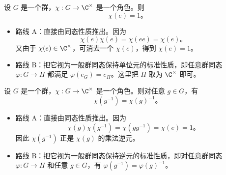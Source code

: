 \begin{theorem}[候选定理 $T_{9}$]
设 $G$ 是一个群，$\chi : G \to \C^\times$ 是一个角色。则
\[
\chi(e)=1。
\]
\end{theorem}

\begin{itemize}
    \item 路线 A：直接由同态性质推出。因为
    \[
    \chi(e)\chi(e)=\chi(ee)=\chi(e)。
    \]
    又由于 $\chi(e)\in \C^\times$，可消去一个 $\chi(e)$，得到
    $
    \chi(e)=1。
    $

    \item 路线 B：把它视为一般群同态保持单位元的标准性质，即任意群同态 $\varphi:G\to H$ 都满足 $\varphi(e_G)=e_H$。这里把 $H$ 取为 $\C^\times$ 即可。
\end{itemize}


\vspace{1em}

\begin{theorem}[候选定理 $T_{10}$]
设 $G$ 是一个群，$\chi : G \to \C^\times$ 是一个角色。则对任意 $g \in G$，有
\[
\chi(g^{-1})=\chi(g)^{-1}。
\]
\end{theorem}

\begin{itemize}
    \item 路线 A：直接由同态性质推出。因为
    \[
    \chi(g)\chi(g^{-1})
    =
    \chi(gg^{-1})
    =
    \chi(e)
    =
    1。
    \]
    因此 $\chi(g^{-1})$ 正是 $\chi(g)$ 的乘法逆元。

    \item 路线 B：把它视为一般群同态保持逆元的标准性质，即对任意群同态 $\varphi:G\to H$ 和任意 $g\in G$，有
    $
    \varphi(g^{-1})=\varphi(g)^{-1}。
    $
\end{itemize}


